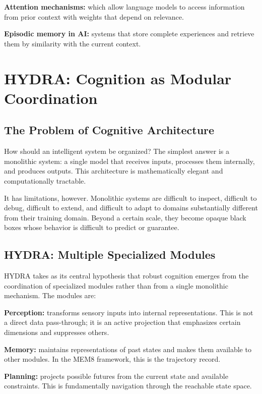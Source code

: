 \documentclass[11pt, a4paper]{article}
\theoremstyle{named}
\begin{document}
\textbf{Attention mechanisms:} which allow language models to access
information from prior context with weights that depend on relevance.

\textbf{Episodic memory in AI:} systems that store complete
experiences and retrieve them by similarity with the current context.

\section{HYDRA: Cognition as Modular Coordination}

\subsection{The Problem of Cognitive Architecture}

How should an intelligent system be organized? The simplest answer
is a monolithic system: a single model that receives inputs, processes
them internally, and produces outputs. This architecture is
mathematically elegant and computationally tractable.

It has limitations, however. Monolithic systems are difficult to
inspect, difficult to debug, difficult to extend, and difficult to
adapt to domains substantially different from their training domain.
Beyond a certain scale, they become opaque black boxes whose behavior
is difficult to predict or guarantee.

\subsection{HYDRA: Multiple Specialized Modules}

HYDRA takes as its central hypothesis that robust cognition emerges
from the coordination of specialized modules rather than from a
single monolithic mechanism. The modules are:

\textbf{Perception:} transforms sensory inputs into internal
representations. This is not a direct data pass-through; it is an
active projection that emphasizes certain dimensions and suppresses
others.

\textbf{Memory:} maintains representations of past states and makes
them available to other modules. In the MEM\textbar{}8 framework, this
is the trajectory record.

\textbf{Planning:} projects possible futures from the current state
and available constraints. This is fundamentally navigation through
the reachable state space.
\end{document}

